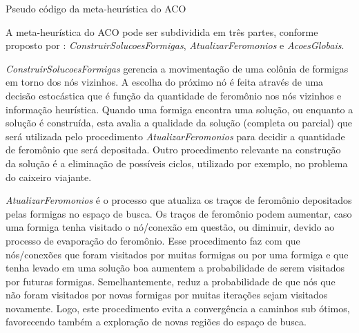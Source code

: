 \begin{algorithm}[H]


  \caption{Pseudo código da meta-heurística do ACO\label{lst:meta-heuristica_aco}}
\end{algorithm}

A meta-heurística do ACO pode ser subdividida em três partes,
conforme proposto por \cite{doringo2004ant}: \textit{ConstruirSolucoesFormigas},
\textit{AtualizarFeromonios} e \textit{AcoesGlobais}.

\textit{ConstruirSolucoesFormigas} gerencia a movimentação de uma colônia de formigas
em torno dos nós vizinhos. A escolha do próximo nó é feita através de uma decisão
estocástica que é função da quantidade de feromônio nos nós vizinhos e informação heurística.
Quando uma formiga encontra uma solução, ou enquanto a solução é construída, esta avalia a
qualidade da solução (completa ou parcial) que será utilizada pelo procedimento
\textit{AtualizarFeromonios} para decidir a quantidade de feromônio que será depositada.
Outro procedimento relevante na construção da solução é a eliminação de possíveis ciclos, utilizado
por exemplo, no problema do caixeiro viajante.

\textit{AtualizarFeromonios} é o processo que atualiza os traços de feromônio depositados pelas
formigas no espaço de busca. Os traços de feromônio podem aumentar, caso uma formiga tenha visitado
o nó/conexão em questão, ou diminuir, devido ao processo de evaporação do feromônio. Esse procedimento faz com 
que nós/conexões que foram visitados por muitas formigas ou por uma formiga e que tenha levado em
uma solução boa aumentem a probabilidade de serem visitados por futuras formigas. Semelhantemente, reduz 
a probabilidade de que nós que não foram visitados por novas formigas por muitas iterações sejam visitados
novamente. Logo, este procedimento evita a convergência a caminhos sub ótimos, favorecendo também a exploração
de novas regiões do espaço de busca.

